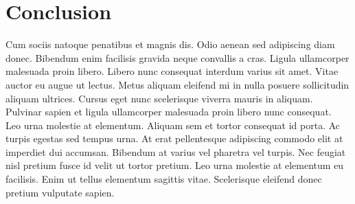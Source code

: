 \documentclass[letterpaper,12pt]{article}
\begin{document}

\section{Conclusion}
\label{sec:conclusion}

Cum sociis natoque penatibus et magnis dis. Odio aenean sed adipiscing diam donec. Bibendum enim facilisis gravida neque convallis a cras. Ligula ullamcorper malesuada proin libero. Libero nunc consequat interdum varius sit amet. Vitae auctor eu augue ut lectus. Metus aliquam eleifend mi in nulla posuere sollicitudin aliquam ultrices. Cursus eget nunc scelerisque viverra mauris in aliquam. Pulvinar sapien et ligula ullamcorper malesuada proin libero nunc consequat.\\

Leo urna molestie at elementum. Aliquam sem et tortor consequat id porta. Ac turpis egestas sed tempus urna. At erat pellentesque adipiscing commodo elit at imperdiet dui accumsan. Bibendum at varius vel pharetra vel turpis. Nec feugiat nisl pretium fusce id velit ut tortor pretium. Leo urna molestie at elementum eu facilisis. Enim ut tellus elementum sagittis vitae. Scelerisque eleifend donec pretium vulputate sapien.


\end{document}

